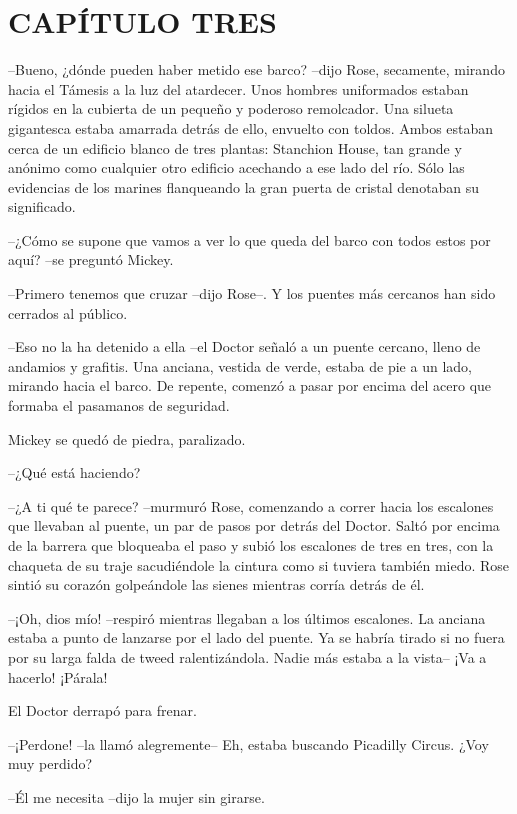 \chapter*{CAPÍTULO TRES}

{--Bueno, ¿dónde pueden haber metido ese barco? --dijo Rose, secamente,
 mirando hacia el Támesis a la luz del atardecer. Unos hombres
 uniformados estaban rígidos en la cubierta de un pequeño y poderoso
 remolcador. Una silueta gigantesca estaba amarrada detrás de ello,
 envuelto con toldos. Ambos estaban cerca de un edificio blanco de tres
 plantas: Stanchion House, tan grande y anónimo como cualquier otro
 edificio acechando a ese lado del río. Sólo las evidencias de los
marines flanqueando la gran puerta de cristal denotaban su significado.}

{--¿Cómo se supone que vamos a ver lo que queda del barco con todos
estos por aquí? --se preguntó Mickey.}

{--Primero tenemos que cruzar --dijo Rose--. Y los puentes más cercanos
han sido cerrados al público.}

{--Eso no la ha detenido a ella --el Doctor señaló a un puente cercano,
 lleno de andamios y grafitis. Una anciana, vestida de verde, estaba de
 pie a un lado, mirando hacia el barco. De repente, comenzó a pasar por
encima del acero que formaba el pasamanos de seguridad.}

{Mickey se quedó de piedra, paralizado.}

{--¿Qué está haciendo?}

{--¿A ti qué te parece? --murmuró Rose, comenzando a correr hacia los
 escalones que llevaban al puente, un par de pasos por detrás del Doctor.
 Saltó por encima de la barrera que bloqueaba el paso y subió los
 escalones de tres en tres, con la chaqueta de su traje sacudiéndole la
 cintura como si tuviera también miedo. Rose sintió su corazón
golpeándole las sienes mientras corría detrás de él.}

{--¡Oh, dios mío! --respiró mientras llegaban a los últimos escalones.
 La anciana estaba a punto de lanzarse por el lado del puente. Ya se
 habría tirado si no fuera por su larga falda de tweed ralentizándola.
Nadie más estaba a la vista-- ¡Va a hacerlo! ¡Párala!}

{El Doctor derrapó para frenar.}

{--¡Perdone! --la llamó alegremente-- Eh, estaba buscando Picadilly
Circus. ¿Voy muy perdido?}

{--Él me necesita --dijo la mujer sin girarse.}

